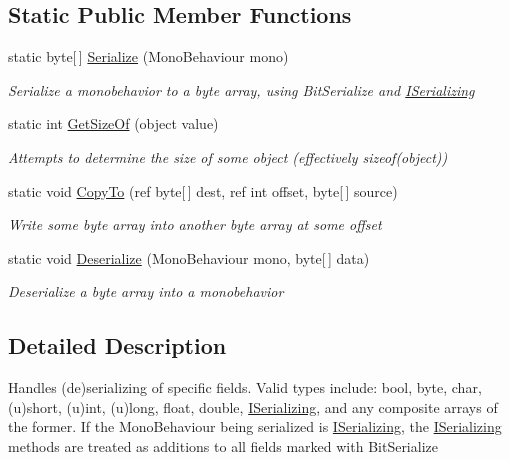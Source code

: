 \subsection*{Static Public Member Functions}
\begin{DoxyCompactItemize}
\item 
static byte\mbox{[}$\,$\mbox{]} \hyperlink{class_bit_serialize_attribute_ac8580fdb91b6ed5544f1bd976c867f52}{Serialize} (Mono\-Behaviour mono)
\begin{DoxyCompactList}\small\item\em Serialize a monobehavior to a byte array, using Bit\-Serialize and \hyperlink{interface_i_serializing}{I\-Serializing} \end{DoxyCompactList}\item 
static int \hyperlink{class_bit_serialize_attribute_a45dcbeb6ab33c11f4d6cc4971bb4ba55}{Get\-Size\-Of} (object value)
\begin{DoxyCompactList}\small\item\em Attempts to determine the size of some object (effectively sizeof(object)) \end{DoxyCompactList}\item 
static void \hyperlink{class_bit_serialize_attribute_aca1cc7a1f81cfffcf0ae04058d2da2c9}{Copy\-To} (ref byte\mbox{[}$\,$\mbox{]} dest, ref int offset, byte\mbox{[}$\,$\mbox{]} source)
\begin{DoxyCompactList}\small\item\em Write some byte array into another byte array at some offset \end{DoxyCompactList}\item 
static void \hyperlink{class_bit_serialize_attribute_ad6b302aa05fc83b760a77776941f55b5}{Deserialize} (Mono\-Behaviour mono, byte\mbox{[}$\,$\mbox{]} data)
\begin{DoxyCompactList}\small\item\em Deserialize a byte array into a monobehavior \end{DoxyCompactList}\end{DoxyCompactItemize}


\subsection{Detailed Description}
Handles (de)serializing of specific fields. Valid types include\-: bool, byte, char, (u)short, (u)int, (u)long, float, double, \hyperlink{interface_i_serializing}{I\-Serializing}, and any composite arrays of the former. If the Mono\-Behaviour being serialized is \hyperlink{interface_i_serializing}{I\-Serializing}, the \hyperlink{interface_i_serializing}{I\-Serializing} methods are treated as additions to all fields marked with Bit\-Serialize 



